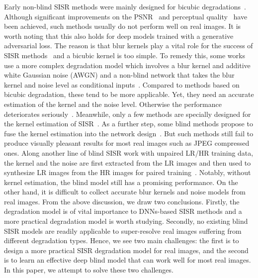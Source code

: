 \documentclass[10pt,twocolumn,letterpaper]{article}
\begin{document}
Early non-blind SISR methods were mainly designed for bicubic degradations~\cite{dong2014learning}. Although significant improvements on the PSNR~\cite{lim2017enhanced,zhang2018residual} and perceptual quality~\cite{wang2018esrgan,ledig2016photo} have been achieved, such methods usually do not perform well on real images.
It is worth noting that this also holds for deep models trained with a generative adversarial loss.
The reason is that blur kernels play a vital role for the success of SISR methods~\cite{efrat2013accurate} and a bicubic kernel is too simple.
To remedy this, some works use a more complex degradation model which involves a blur kernel and additive white Gaussian noise (AWGN) and a non-blind network that takes the blur kernel and noise level as conditional inputs~\cite{zhang2018learning,bell2019blind}. Compared to methods based on bicubic degradation, these tend to be more applicable. Yet, they need an accurate estimation of the kernel and the noise level. Otherwise the performance deteriorates seriously~\cite{efrat2013accurate}. Meanwhile, only a few methods are specially designed for the kernel estimation of SISR~\cite{bell2019blind}. As a further step, some blind methods propose to fuse the kernel estimation into the network design~\cite{gu2019blind,luo2020unfolding}. But such methods still fail to produce visually pleasant results for most real images such as JPEG compressed ones. Along another line of blind SISR work with unpaired LR/HR training data, the kernel and the noise are first extracted from the LR images and then used to synthesize LR images from the HR images for paired training~\cite{ji2020real}. Notably, without kernel estimation, the blind model still has a promising performance. On the other hand, it is difficult to collect accurate blur kernels and noise models from real images.
From the above discussion, we draw two conclusions. Firstly, the degradation model is of vital importance to DNNs-based SISR methods and a more practical degradation model is worth studying.
Secondly, no existing blind SISR models are readily applicable to super-resolve real images suffering from different degradation types.
Hence, we see two main challenges: the first is to design a more practical SISR degradation model for real images, and the second is to learn an effective deep blind model that can work well for most real images. In this paper, we attempt to solve these two challenges.
\end{document}
